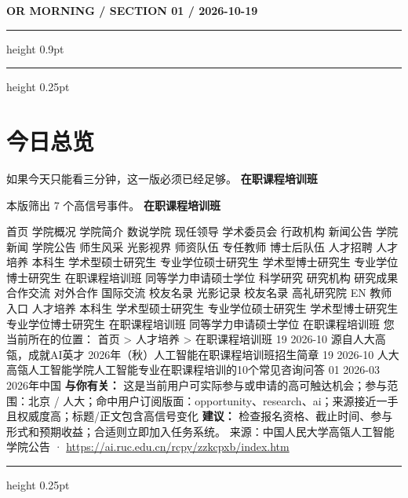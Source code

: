 \documentclass[10.5pt]{ctexart}
\begin{document}
{\small\bfseries OR MORNING / SECTION 01 / 2026-10-19}
\vspace{2mm}
\hrule height 0.9pt
\vspace{1.5mm}
\hrule height 0.25pt
\vspace{4mm}
\section*{今日总览}
{\color{ormuted} 如果今天只能看三分钟，这一版必须已经足够。}
\vspace{2mm}
{\fontsize{25}{29}\selectfont\bfseries 在职课程培训班}\par
\vspace{2mm}
{\large 本版筛出 7 个高信号事件。}
\vspace{3mm}
{\Large\bfseries 在职课程培训班}\par
首页 学院概况 学院简介 数说学院 现任领导 学术委员会 行政机构 新闻公告 学院新闻 学院公告 师生风采 光影视界 师资队伍 专任教师 博士后队伍 人才招聘 人才培养 本科生 学术型硕士研究生 专业学位硕士研究生 学术型博士研究生 专业学位博士研究生 在职课程培训班 同等学力申请硕士学位 科学研究 研究机构 研究成果 合作交流 对外合作 国际交流 校友名录 光影记录 校友名录 高礼研究院 EN 教师入口 人才培养 本科生 学术型硕士研究生 专业学位硕士研究生 学术型博士研究生 专业学位博士研究生 在职课程培训班 同等学力申请硕士学位 在职课程培训班 您当前所在的位置： 首页 > 人才培养 > 在职课程培训班 19 2026-10 源自人大高瓴，成就AI英才 2026年（秋）人工智能在职课程培训班招生简章 19 2026-10 人大高瓴人工智能学院人工智能专业在职课程培训的10个常见咨询问答 01 2026-03 2026年中国
\textbf{与你有关：} 这是当前用户可实际参与或申请的高可触达机会；参与范围：北京 / 人大；命中用户订阅版面：opportunity、research、ai；来源接近一手且权威度高；标题/正文包含高信号变化
\textbf{建议：} 检查报名资格、截止时间、参与形式和预期收益；合适则立即加入任务系统。
{\footnotesize\color{ormuted} 来源：中国人民大学高瓴人工智能学院公告 · \url{https://ai.ruc.edu.cn/rcpy/zzkcpxb/index.htm}}
\vspace{3mm}
\hrule height 0.25pt
\vspace{3mm}
\end{document}

